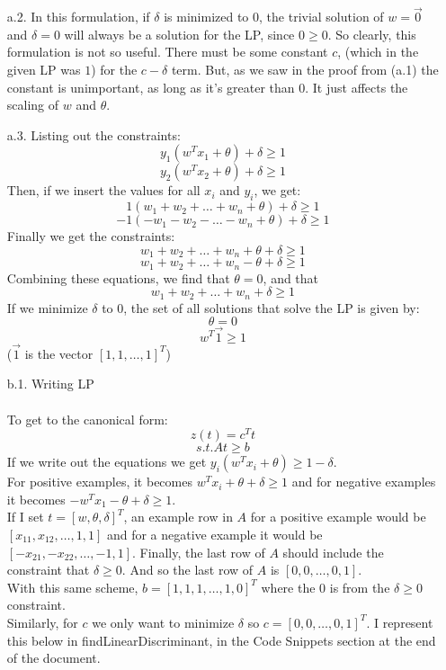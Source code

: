\begin{enumerate}
\begin{enumerate}
        \item[a.2.]
                In this formulation, if $\delta$ is minimized to $0$, the trivial solution of $w = \vec{0}$ and $\delta = 0$ will always be a solution for the LP, since $0 \geq 0$. So clearly, this formulation is not so useful. There must be some constant $c$, (which in the given LP was $1$) for the $c-\delta$ term. But, as we saw in the proof from (a.1) the constant is unimportant, as long as it's greater than $0$. It just affects the scaling of $w$ and $\theta$.
        \item[a.3.]
                Listing out the constraints:
                $$y_1(w^Tx_1+\theta)+\delta \geq 1$$
                $$y_2(w^Tx_2+\theta)+\delta \geq 1$$
                Then, if we insert the values for all $x_i$ and $y_i$, we get:\\
                $$1(w_1+w_2+\ldots+w_n+\theta)+\delta \geq 1$$
                $$-1(-w_1-w_2-\ldots-w_n+\theta)+\delta \geq 1$$
                Finally we get the constraints:
                $$w_1+w_2+\ldots+w_n+\theta+\delta \geq 1$$
                $$w_1+w_2+\ldots+w_n-\theta+\delta \geq 1$$
                Combining these equations, we find that $\theta = 0$, and that
                $$w_1+w_2+\ldots+w_n + \delta \geq 1$$
                If we minimize $\delta$ to $0$, the set of all solutions that solve the LP is given by:
                $$\theta = 0$$
                $$w^T\vec{1} \geq 1$$
                ($\vec{1}$ is the vector $[1,1,\ldots,1]^T$)
        \item[b.1.] Writing LP\\\\
                To get to the canonical form:
                   $$z(t) = c^Tt$$
                   $$s.t. At \geq b$$
                If we write out the equations we get $y_i(w^Tx_i+\theta) \geq 1-\delta$. \\
                For positive examples, it becomes $w^Tx_i+\theta+\delta \geq 1$ and for negative examples it becomes $-w^Tx_1-\theta+\delta \geq 1$.\\          
                If I set $t = [w,\theta,\delta]^T$, an example row in $A$ for a positive example would be $[x_{11},x_{12},\ldots,1,1]$ and for a negative example it would be $[-x_{21},-x_{22},\ldots,-1,1]$. Finally, the last row of $A$ should include the constraint that $\delta \geq 0$. And so the last row of $A$ is $[0,0,\ldots,0,1]$. \\
                With this same scheme, $b = [1,1,1,\ldots,1,0]^T$ where the 0 is from the $\delta \geq 0$ constraint.\\
                Similarly, for $c$ we only want to minimize $\delta$ so $c=[0,0,\ldots,0,1]^T$. I represent this below in findLinearDiscriminant, in the Code Snippets section at the end of the document.\\


\end{enumerate}
\end{enumerate}
